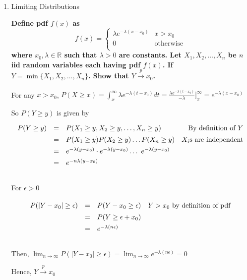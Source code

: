 \documentclass[12pt, oneside]{article}
\begin{document}
\begin{enumerate}


\item Limiting Distributions

\noindent \textbf{Define pdf $f(x)$ as
\[
    f(x) = 
    \begin{cases}
               \lambda e^{-\lambda(x-x_0)} & x > x_0\\
               0 & \text{otherwise}\\
    \end{cases}
\] where $x_0,\lambda \in \mathbb{R}$ such that $\lambda > 0$ are constants. Let $X_1,X_2,\dots,X_n$ be $n$ iid random variables each having pdf $f(x)$. If $Y = \min\{X_1,X_2,\dots,X_n\}$. Show that $Y \xrightarrow[]{p} x_0$. 
}


For any $x>x_0$, $P(X\ge x) = \int_{x}^\infty \lambda e^{-\lambda(t-x_0)} dt = 
\frac{\lambda e^{-\lambda(t-x_0)}}{-\lambda} \Big]_{x}^{\infty} 
= e^{-\lambda(x-x_0)}
 $ 

So $P(Y \ge y)$ is given by
\[\def\arraystretch{1.4}
  \begin{array}{lclr}
     P(Y \ge y) & = & P(X_1 \ge y, X_2 \ge y, \dots, X_n \ge y) & \text{By definition of }Y\\
     ~ & = &  P(X_1 \ge y)P(X_2 \ge y)\dots P(X_n \ge y) & X_i\text{s are independent} \\
     ~ & = &  e^{-\lambda(y-x_0)}\cdot e^{-\lambda(y-x_0)} \dots ~ e^{-\lambda(y-x_0)} & \\
     ~ &  = & e^{-n\lambda(y-x_0)} &\\ 
  \end{array}
\]\\

For $\epsilon > 0$

\[\def\arraystretch{1.4}
  \begin{array}{lclr}
     P(|Y - x_0| \ge \epsilon) & = & P(Y - x_0 \ge \epsilon) & Y > x_0\text{ by definition of pdf}\\
     ~ & = &  P(Y \ge \epsilon + x_0) & \\
     ~ & = &  e^{-\lambda(n\epsilon)}
  \end{array}
\]\\

Then, $\lim_{n \to \infty}P(|Y - x_0| \ge \epsilon) = \lim_{n \to \infty} e^{-\lambda(n\epsilon)} = 0 $

Hence, $Y \xrightarrow[]{p} x_0$

\end{enumerate}
\end{document}
